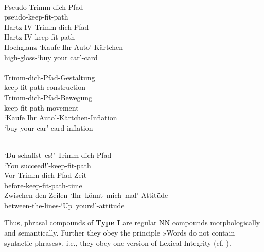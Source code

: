 \documentclass[output=paper]{LSP/langsci}
\begin{document}
\ea\label{ex:pafel:91}
      \\
      \ea\label{ex:pafel:91a}      
      \gll  Pseudo-Trimm-dich-Pfad\\
            pseudo-keep-fit-path\\
      \ex\label{ex:pafel:91b}
      \gll   Hartz-IV-Trimm-dich-Pfad \\             
             Hartz-IV-keep-fit-path\\
      \ex\label{ex:pafel:91c}
      Hochglanz-`Kaufe Ihr Auto'-Kärtchen \\             
      high-gloss-`buy your car'-card\\
    \z
\z 
\newpage
\ea\label{ex:pafel:92}
      \\
      \ea\label{ex:pafel:92a}      
      \gll  Trimm-dich-Pfad-Gestaltung\\
            keep-fit-path-construction \\
      \ex\label{ex:pafel:92b}
      \gll   Trimm-dich-Pfad-Bewegung \\             
             keep-fit-path-movement \\
      \ex\label{ex:pafel:92c}
      \gll   `{Kaufe Ihr Auto}'-Kärtchen-Inflation \\             
             `{buy your car}'-card-inflation \\
    \z
\z 

\ea\label{ex:pafel:93}
      \\
      \ea\label{ex:pafel:93a}      
      \gll  `Du schaffst~es!'-Trimm-dich-Pfad\\
            `You succeed!'-keep-fit-path \\
      \ex\label{ex:pafel:93b}
      \gll   Vor-Trimm-dich-Pfad-Zeit \\             
             before-keep-fit-path-time \\
      \ex\label{ex:pafel:93c}
         Zwischen-den-Zeilen `Ihr~könnt~mich~mal'-Attitüde \\             
             between-the-lines-`Up~yours!'-attitude \\
    \z
\z 

Thus, phrasal compounds of \textbf{Type I} are regular NN compounds morphologically and semantically. Further they obey the principle »Words do not contain syntactic phrases«, i.e., they obey one version of Lexical Integrity (cf. \citealt{Pafel2015}). 
\end{document}
